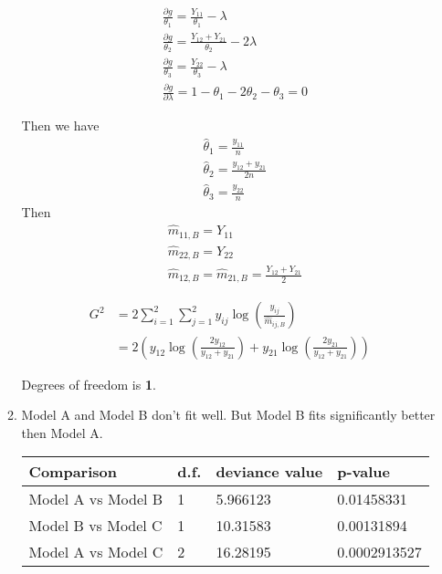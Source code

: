 \documentclass{article}
\begin{document}
\begin{enumerate}[leftmargin = 0 em, label = \arabic*., font = \bfseries]
\begin{enumerate}
		\begin{align*}
		&\frac{\partial g}{\theta_1} = \frac{Y_{11}}{\theta_1} - \lambda\\
		&\frac{\partial g}{\theta_2} = \frac{Y_{12} + Y_{21}}{\theta_2} - 2\lambda\\
		&\frac{\partial g}{\theta_3} = \frac{Y_{22}}{\theta_3} - \lambda\\
		&\frac{\partial g}{\partial \lambda} = 1 - \theta_1 - 2 \theta_2  - \theta_3= 0
		\end{align*}

		Then we have
		\begin{align*}
		&\hat{\theta}_1 = \frac{y_{11}}{n}\\
		&\hat{\theta}_2 = \frac{y_{12} + y_{21}}{2n}\\
		&\hat{\theta}_3 = \frac{y_{22}}{n}
		\end{align*}
		Then
		\begin{align*}
		&\hat{m}_{11,B} = Y_{11}\\
		& \hat{m}_{22, B} = Y_{22}\\
		&\hat{m}_{12, B} = \hat{m}_{21, B} = \frac{{Y}_{12} +Y_{21}}{2}
		\end{align*}

		\begin{align*}
		G^2 & = 2 \sum_{i = 1}^2 \sum_{j=1}^2 y_{ij} \log \left(\frac{y_{ij}}{\hat{m}_{ij, B}}\right)\\
		& = 2 \left(y_{12} \log \left(\frac{2y_{12}}{y_{12} + y_{21}}\right) + y_{21} \log \left(\frac{2y_{21}}{y_{12} + y_{21}}\right)\right)
		\end{align*}

		Degrees of freedom is \textbf{1}.

		\item Model A and Model B don't fit well. But Model B fits significantly better then Model A.

		\begin{center}
		\begin{tabular}{llll}
				\textbf{Comparison} & \textbf{d.f.} &\textbf{deviance value} & \textbf{p-value}\\
				\midrule
				Model A vs Model B & 1  & 5.966123 & 0.01458331\\
				Model B vs Model C & 1 &  10.31583 & 0.00131894\\
				\midrule
				Model A vs Model C & 2 & 16.28195 & 0.0002913527		
				\end{tabular}
				\end{center}


\end{enumerate}
\end{enumerate}
\end{document}
